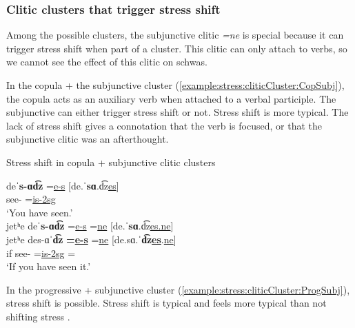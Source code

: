 \subsubsection{Clitic clusters that   trigger stress shift}\label{section:stress:cliticc:cluster:Shift}
Among the possible clusters, the subjunctive clitic \textit{=ne} is special because it can trigger stress shift when part of a cluster. This clitic can only attach to verbs, so we cannot see the effect of this clitic on schwas. 

In the  copula + the subjunctive cluster (\ref{example:stress:cliticCluster:CopSubj}),  the copula acts as an auxiliary verb when attached to a verbal participle. The subjunctive can either trigger stress shift or not. Stress shift is more typical. The lack of stress shift gives a connotation that the verb is focused, or that the subjunctive clitic was an afterthought. 

\begin{exe}
	\ex Stress shift in copula  + subjunctive clitic clusters \label{example:stress:cliticCluster:CopSubj}
	\begin{xlist}
		\ex \gll   deˈ\textbf{s-ɑd͡z} =\underline{e-s}  [de.ˈ\textbf{sɑ}.d͡z\underline{es}]
		\\
		see-{\rptcp} =\underline{is-2sg} 
		\\
		\trans `You have seen.'
		\\
		\ex \glll  jetʰe deˈ\textbf{s-ɑd͡z} =\underline{e-s} =\underline{ne}  [de.ˈ\textbf{sɑ}.d͡z\underline{es.ne}]
		\\
		jetʰe des-ɑˈ\textbf{d͡z} \textbf{=\underline{e-s}} =\underline{ne}  [de.sɑ.ˈ\textbf{d͡z\underline{es}}.\underline{ne}]
		\\
		if see-{\rptcp} =\underline{is-2sg} =\underline{{\sbjv}}
		\\
		\trans `If you have seen it.'
		\\
	\end{xlist}
\end{exe}

In the progressive + subjunctive cluster (\ref{example:stress:cliticCluster:ProgSubj}), stress shift is   possible. Stress shift is typical and feels more typical than not shifting stress \citep[84]{Khanjian-2013-DissNegativeConcord}. 

